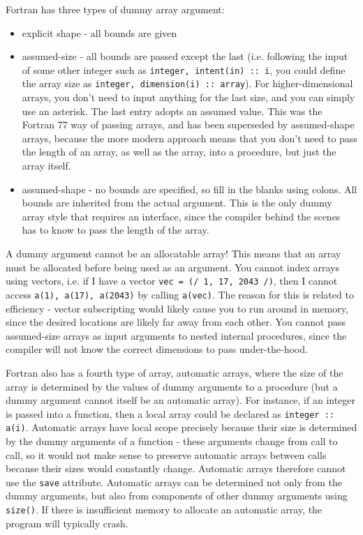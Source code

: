 \documentclass[10pt]{article}
\begin{document}
Fortran has three types of dummy array argument:

\begin{itemize}
\item explicit shape - all bounds are given
\item assumed-size - all bounds are passed except the last (i.e. following the input of some other integer such as {\tt integer, intent(in) :: i}, you could define the array size as {\tt integer, dimension(i) :: array}). For higher-dimensional arrays, you don't need to input anything for the last size, and you can simply use an asterisk. The last entry adopts an assumed value. This was the Fortran 77 way of passing arrays, and has been superseded by assumed-shape arrays, because the more modern approach means that you don't need to pass the length of an array, as well as the array, into a procedure, but just the array itself.
\item assumed-shape - no bounds are specified, so fill in the blanks using colons. All bounds are inherited from the actual argument. This is the only dummy array style that requires an interface, since the compiler behind the scenes has to know to pass the length of the array. 
\end{itemize}

A dummy argument cannot be an allocatable array! This means that an array must be allocated before being used as an argument. You cannot index arrays using vectors, i.e. if I have a vector {\tt vec = (/ 1, 17, 2043 /)}, then I cannot access {\tt a(1), a(17), a(2043)} by calling {\tt a(vec)}. The reason for this is related to efficiency - vector subscripting would likely cause you to run around in memory, since the desired locations are likely far away from each other. You cannot pass assumed-size arrays as input arguments to nested internal procedures, since the compiler will not know the correct dimensions to pass under-the-hood.

Fortran also has a fourth type of array, automatic arrays, where the size of the array is determined by the values of dummy arguments to a procedure (but a dummy argument cannot itself be an automatic array). For instance, if an integer is passed into a function, then a local array could be declared as {\tt integer :: a(i)}. Automatic arrays have local scope precisely because their size is determined by the dummy arguments of a function - these arguments change from call to call, so it would not make sense to preserve automatic arrays between calls because their sizes would constantly change. Automatic arrays therefore cannot use the {\tt save} attribute. Automatic arrays can be determined not only from the dummy arguments, but also from components of other dummy arguments using {\tt size()}. If there is insufficient memory to allocate an automatic array, the program will typically crash. 
\end{document}
